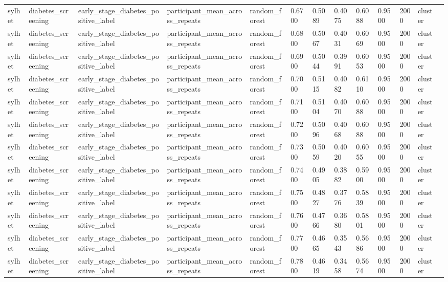 \begin{tabular}{lllllllllllll}
sylhet & diabetes\_screening & early\_stage\_diabetes\_positive\_label & participant\_mean\_across\_repeats & random\_forest & 0.6700 & 0.5089 & 0.4075 & 0.6088 & 0.9500 & 2000 & cluster &  \\
sylhet & diabetes\_screening & early\_stage\_diabetes\_positive\_label & participant\_mean\_across\_repeats & random\_forest & 0.6800 & 0.5067 & 0.4031 & 0.6069 & 0.9500 & 2000 & cluster &  \\
sylhet & diabetes\_screening & early\_stage\_diabetes\_positive\_label & participant\_mean\_across\_repeats & random\_forest & 0.6900 & 0.5044 & 0.3991 & 0.6053 & 0.9500 & 2000 & cluster &  \\
sylhet & diabetes\_screening & early\_stage\_diabetes\_positive\_label & participant\_mean\_across\_repeats & random\_forest & 0.7000 & 0.5115 & 0.4082 & 0.6110 & 0.9500 & 2000 & cluster &  \\
sylhet & diabetes\_screening & early\_stage\_diabetes\_positive\_label & participant\_mean\_across\_repeats & random\_forest & 0.7100 & 0.5104 & 0.4070 & 0.6088 & 0.9500 & 2000 & cluster &  \\
sylhet & diabetes\_screening & early\_stage\_diabetes\_positive\_label & participant\_mean\_across\_repeats & random\_forest & 0.7200 & 0.5096 & 0.4068 & 0.6088 & 0.9500 & 2000 & cluster &  \\
sylhet & diabetes\_screening & early\_stage\_diabetes\_positive\_label & participant\_mean\_across\_repeats & random\_forest & 0.7300 & 0.5059 & 0.4020 & 0.6055 & 0.9500 & 2000 & cluster &  \\
sylhet & diabetes\_screening & early\_stage\_diabetes\_positive\_label & participant\_mean\_across\_repeats & random\_forest & 0.7400 & 0.4905 & 0.3882 & 0.5900 & 0.9500 & 2000 & cluster &  \\
sylhet & diabetes\_screening & early\_stage\_diabetes\_positive\_label & participant\_mean\_across\_repeats & random\_forest & 0.7500 & 0.4827 & 0.3776 & 0.5839 & 0.9500 & 2000 & cluster &  \\
sylhet & diabetes\_screening & early\_stage\_diabetes\_positive\_label & participant\_mean\_across\_repeats & random\_forest & 0.7600 & 0.4766 & 0.3680 & 0.5801 & 0.9500 & 2000 & cluster &  \\
sylhet & diabetes\_screening & early\_stage\_diabetes\_positive\_label & participant\_mean\_across\_repeats & random\_forest & 0.7700 & 0.4665 & 0.3543 & 0.5686 & 0.9500 & 2000 & cluster &  \\
sylhet & diabetes\_screening & early\_stage\_diabetes\_positive\_label & participant\_mean\_across\_repeats & random\_forest & 0.7800 & 0.4619 & 0.3458 & 0.5674 & 0.9500 & 2000 & cluster &  \\

\end{tabular}
